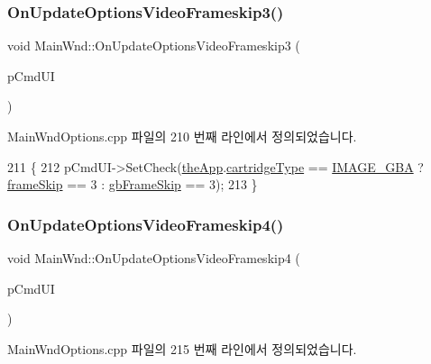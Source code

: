 \subsubsection{\texorpdfstring{On\+Update\+Options\+Video\+Frameskip3()}{OnUpdateOptionsVideoFrameskip3()}}
{\footnotesize\ttfamily void Main\+Wnd\+::\+On\+Update\+Options\+Video\+Frameskip3 (\begin{DoxyParamCaption}\item[{C\+Cmd\+UI $\ast$}]{p\+Cmd\+UI }\end{DoxyParamCaption})\hspace{0.3cm}{\ttfamily [protected]}}



Main\+Wnd\+Options.\+cpp 파일의 210 번째 라인에서 정의되었습니다.


\begin{DoxyCode}
211 \{
212   pCmdUI->SetCheck(\mbox{\hyperlink{_v_b_a_8cpp_a8095a9d06b37a7efe3723f3218ad8fb3}{theApp}}.\mbox{\hyperlink{class_v_b_a_af300759fcbc7eeb00ce73f956fc5ddb7}{cartridgeType}} == \mbox{\hyperlink{_util_8h_aef8b88d56fdf9a25f990a68d80c014d8a25f0ac1f3a37d568346fedece32e4bfb}{IMAGE\_GBA}} ? 
      \mbox{\hyperlink{_globals_8cpp_a668e22999d7fcea3ed14130fd680b795}{frameSkip}} == 3 : \mbox{\hyperlink{_g_b_8cpp_a2139360d32d74969f470ef05414ecaf8}{gbFrameSkip}} == 3);
213 \}
\end{DoxyCode}
\mbox{\label{class_main_wnd_a793b2ef26a9ac27dbfb59dbf86175207}} 
\subsubsection{\texorpdfstring{On\+Update\+Options\+Video\+Frameskip4()}{OnUpdateOptionsVideoFrameskip4()}}
{\footnotesize\ttfamily void Main\+Wnd\+::\+On\+Update\+Options\+Video\+Frameskip4 (\begin{DoxyParamCaption}\item[{C\+Cmd\+UI $\ast$}]{p\+Cmd\+UI }\end{DoxyParamCaption})\hspace{0.3cm}{\ttfamily [protected]}}



Main\+Wnd\+Options.\+cpp 파일의 215 번째 라인에서 정의되었습니다.


